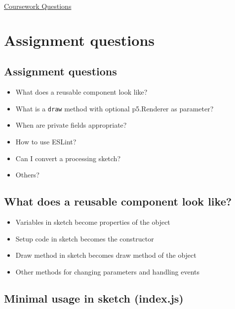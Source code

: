 \documentclass{article}[18pt]
\providecommand{\tightlist}{%
	\setlength{\itemsep}{0pt}\setlength{\parskip}{0pt}}
\begin{document}
\begin{center}
\underline{\huge Coursework Questions}
\end{center}


\hypertarget{assignment-questions}{%
	\section{Assignment questions}\label{assignment-questions}}

\hypertarget{assignment-questions-1}{%
	\subsection{Assignment questions}\label{assignment-questions-1}}

\begin{itemize}
	\tightlist
	\item
	What does a reusable component look like?
	\item
	What is a \texttt{draw} method with optional p5.Renderer as parameter?
	\item
	When are private fields appropriate?
	\item
	How to use ESLint?
	\item
	Can I convert a processing sketch?
	\item
	Others?
\end{itemize}

\hypertarget{what-does-a-reusable-component-look-like}{%
	\subsection{What does a reusable component look
		like?}\label{what-does-a-reusable-component-look-like}}

\begin{itemize}
	\tightlist
	\item
	Variables in sketch become properties of the object
	\item
	Setup code in sketch becomes the constructor
	\item
	Draw method in sketch becomes draw method of the object
	\item
	Other methods for changing parameters and handling events
\end{itemize}

\hypertarget{minimal-usage-in-sketch-index.js}{%
	\subsection{Minimal usage in sketch
		(index.js)}\label{minimal-usage-in-sketch-index.js}}
\end{document}
